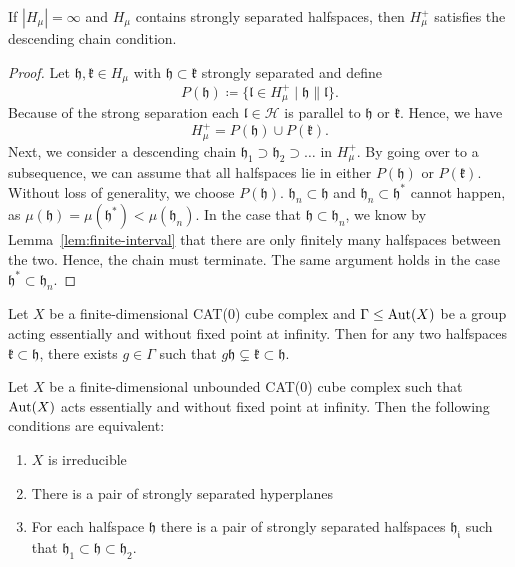 \begin{lemma}[{\cite[Lemma~4.18]{MR3509968}}]
  \label{lem:4.18}
  If \(|H_\mu| = \infty\) and \(H_\mu\) contains strongly separated halfspaces, then \(H_\mu^+\) satisfies the descending chain condition.
\end{lemma}

\begin{proof}
  Let \(\mathfrak{h, k} \in H_\mu\) with \(\mathfrak{h} \subset \mathfrak{k}\) strongly separated and define
  \[
    P(\mathfrak{h}) \coloneqq \{\mathfrak{l} \in H_\mu^+ \mid \mathfrak{h} \parallel \mathfrak{l}\}.
  \]
  Because of the strong separation each \(\mathfrak{l} \in \mathcal{H}\) is parallel to \(\mathfrak{h}\) or \(\mathfrak{k}\). Hence, we have
  \[
    H_\mu^+ = P(\mathfrak{h}) \cup P(\mathfrak{k}).
  \]
  Next, we consider a descending chain \(\mathfrak{h_1} \supset \mathfrak{h_2} \supset \dots\) in \(H_\mu^+\). By going over to a subsequence, we can assume that all halfspaces lie in either \(P(\mathfrak{h})\) or \(P(\mathfrak{k})\). Without loss of generality, we choose \(P(\mathfrak{h})\). \(\mathfrak{h}_n \subset \mathfrak{h}\) and \(\mathfrak{h}_n \subset \mathfrak{h}^\ast\) cannot happen, as \(\mu(\mathfrak{h}) = \mu(\mathfrak{h}^\ast) < \mu(\mathfrak{h}_n)\). In the case that \(\mathfrak{h} \subset \mathfrak{h}_n\), we know by Lemma~\ref{lem:finite-interval} that there are only finitely many halfspaces between the two. Hence, the chain must terminate. The same argument holds in the case \(\mathfrak{h}^\ast \subset \mathfrak{h}_n\).
\end{proof}

\begin{lemma}
  \label{lem:cs-dsl}
  Let \(X\) be a finite-dimensional CAT(0) cube complex and \(\Gamma \leq \operatorname{Aut}(X)\) be a group acting essentially and without fixed point at infinity. Then for any two halfspaces \(\mathfrak{k} \subset \mathfrak{h}\), there exists \(g \in \Gamma\) such that \(g \mathfrak{h} \subsetneq \mathfrak{k} \subset \mathfrak{h}\).
\end{lemma}

\begin{prop}
  \label{prop:cs-5.1}
  Let \(X\) be a finite-dimensional unbounded CAT(0) cube complex such that \(\operatorname{Aut}(X)\) acts essentially and without fixed point at infinity. Then the following conditions are equivalent:
  \begin{enumerate}
  \item \(X\) is irreducible
  \item There is a pair of strongly separated hyperplanes
  \item For each halfspace \(\mathfrak{h}\) there is a pair of strongly separated halfspaces \(\mathfrak{h_i}\) such that \(\mathfrak{h}_1 \subset \mathfrak{h} \subset \mathfrak{h}_2\).
  \end{enumerate}
\end{prop}

